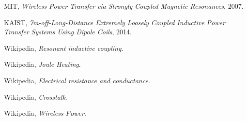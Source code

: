 \documentclass[12pt]{report}
\begin{document}
\begin{thebibliography}{9}
    
  MIT,
  \emph{Wireless Power Transfer via Strongly Coupled Magnetic Resonances},
  2007.

  KAIST,
  \emph{7m-off-Long-Distance Extremely Loosely Coupled Inductive Power Transfer Systems Using Dipole Coils},
  2014.
  
  Wikipedia,
  \emph{Resonant inductive coupling}.
  
  Wikipedia,
  \emph{Joule Heating}.
  
  Wikipedia,
  \emph{Electrical resistance and conductance}.
  
  Wikipedia,
  \emph{Crosstalk}.
  
  Wikipedia,
  \emph{Wireless Power}.
  
\end{thebibliography}
\end{document}
